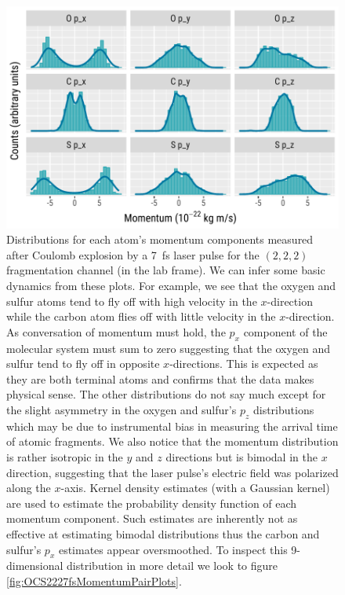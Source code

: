 \begin{figure}
  \centering
  \includegraphics[width=\textwidth]{Plots/OCS2227fsMomentum}
  \caption[Distributions for each atom's momentum components measured after Coulomb explosion by a \SI{7}{\fs} laser pulse for the $(2,2,2)$ fragmentation channel (in the lab frame).]
  {Distributions for each atom's momentum components measured after Coulomb explosion by a \SI{7}{\fs} laser pulse for the $(2,2,2)$ fragmentation channel (in the lab frame). We can infer some basic dynamics from these plots. For example, we see that the oxygen and sulfur atoms tend to fly off with high velocity in the $x$-direction while the carbon atom flies off with little velocity in the $x$-direction. As conversation of momentum must hold, the $p_x$ component of the molecular system must sum to zero suggesting that the oxygen and sulfur tend to fly off in opposite $x$-directions. This is expected as they are both terminal atoms and confirms that the data makes physical sense. The other distributions do not say much except for the slight asymmetry in the oxygen and sulfur's $p_z$ distributions which may be due to instrumental bias in measuring the arrival time of atomic fragments. We also notice that the momentum distribution is rather isotropic in the $y$ and $z$ directions but is bimodal in the $x$ direction, suggesting that the laser pulse's electric field was polarized along the $x$-axis. Kernel density estimates (with a Gaussian kernel) are used to estimate the probability density function of each momentum component. Such estimates are inherently not as effective at estimating bimodal distributions thus the carbon and sulfur's $p_x$ estimates appear oversmoothed. To inspect this 9-dimensional distribution in more detail we look to figure \ref{fig:OCS2227fsMomentumPairPlots}.}
  \label{fig:OCS2227fsMomentum}
\end{figure}

